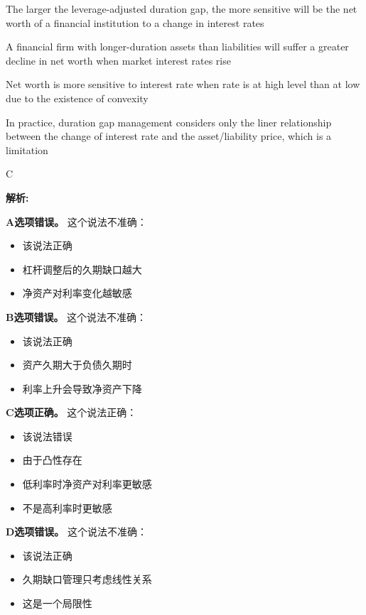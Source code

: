 \documentclass{article}
\newenvironment{explanation}
{\textbf{解析:}\par}
{\par}
\begin{document}
\begin{choices}
    \item The larger the leverage-adjusted duration gap, the more sensitive will be the net worth of a financial institution to a change in interest rates
    \item A financial firm with longer-duration assets than liabilities will suffer a greater decline in net worth when market interest rates rise
    \item Net worth is more sensitive to interest rate when rate is at high level than at low due to the existence of convexity
    \item In practice, duration gap management considers only the liner relationship between the change of interest rate and the asset/liability price, which is a limitation
\end{choices}

\begin{correctanswer}
    C
\end{correctanswer}

\begin{explanation}
    \textbf{A选项错误。}
    这个说法不准确：
    \begin{itemize}
        \item 该说法正确
        \item 杠杆调整后的久期缺口越大
        \item 净资产对利率变化越敏感
    \end{itemize}

    \textbf{B选项错误。}
    这个说法不准确：
    \begin{itemize}
        \item 该说法正确
        \item 资产久期大于负债久期时
        \item 利率上升会导致净资产下降
    \end{itemize}

    \textbf{C选项正确。}
    这个说法正确：
    \begin{itemize}
        \item 该说法错误
        \item 由于凸性存在
        \item 低利率时净资产对利率更敏感
        \item 不是高利率时更敏感
    \end{itemize}

    \textbf{D选项错误。}
    这个说法不准确：
    \begin{itemize}
        \item 该说法正确
        \item 久期缺口管理只考虑线性关系
        \item 这是一个局限性
    \end{itemize}
\end{explanation}
\end{document}
